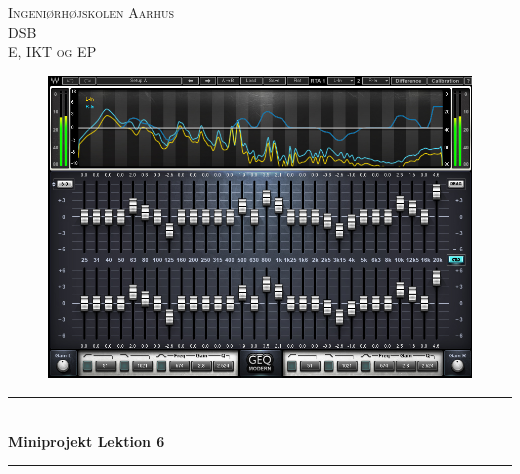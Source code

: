 \begin{titlepage}
		
		\newcommand{\HRule}{\rule{\linewidth}{0.5mm}} %
		
		\center %
		
		
		\textsc{\LARGE Ingeniørhøjskolen Aarhus}\\[1cm] %
		\textsc{\Large DSB}\\[0.5cm] %
		\textsc{\large E, IKT og EP}\\[0.5cm] %
		
		\begin{figure}[ht!]
			\centering
			\includegraphics[width=120mm]{figures/forside.jpg}
		\end{figure}
		
		
		\HRule \\[0.5cm]
		{ \huge \bfseries Miniprojekt Lektion 6}\\[0.4cm] %
		\HRule \\[0.5cm]
		
		

\end{titlepage}
